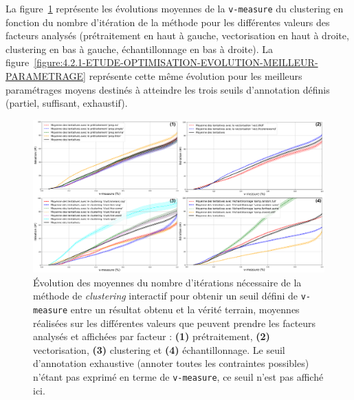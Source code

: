 		
			La figure~\ref{figure:4.2.1-ETUDE-OPTIMISATION-EVOLUTION-PAR-FACTEURS} représente les évolutions moyennes de la \texttt{v-measure} du clustering en fonction du nombre d'itération de la méthode pour les différentes valeurs des facteurs analysés (prétraitement en haut à gauche, vectorisation en haut à droite, clustering en bas à gauche, échantillonnage en bas à droite).
			La figure~\ref{figure:4.2.1-ETUDE-OPTIMISATION-EVOLUTION-MEILLEUR-PARAMETRAGE} représente cette même évolution pour les meilleurs paramétrages moyens destinés à atteindre les trois seuils d'annotation définis (partiel, suffisant, exhaustif).
			\begin{figure}[H]
				\centering
				\includegraphics[width=\textwidth]{figures/etude-efficience-evolution-moyenne-par-vmeasure-par-facteur}
				\caption{Évolution des moyennes du nombre d'itérations nécessaire de la méthode de \textit{clustering} interactif pour obtenir un seuil défini de \texttt{v-measure} entre un résultat obtenu et la vérité terrain, moyennes réalisées sur les différentes valeurs que peuvent prendre les facteurs analysés et affichées par facteur : \textbf{(1)} prétraitement, \textbf{(2)} vectorisation, \textbf{(3)} clustering et \textbf{(4)} échantillonnage. Le seuil d'annotation exhaustive (annoter toutes les contraintes possibles) n'étant pas exprimé en terme de \texttt{v-measure}, ce seuil n'est pas affiché ici.}
				\label{figure:4.2.1-ETUDE-OPTIMISATION-EVOLUTION-PAR-FACTEURS}
			\end{figure}
